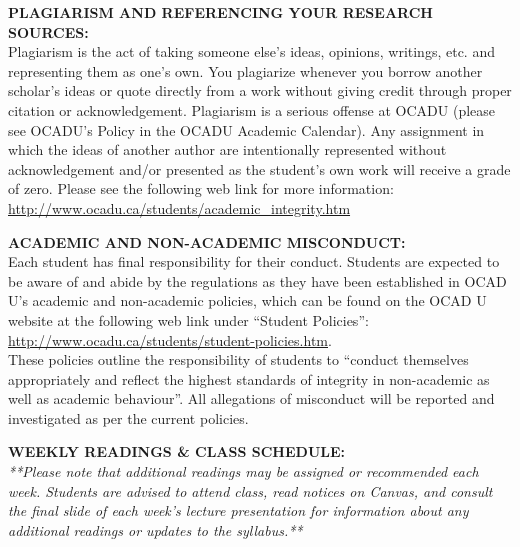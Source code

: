 \documentclass[10pt]{article}
\begin{document}
\textbf{PLAGIARISM AND REFERENCING YOUR RESEARCH SOURCES:}\\
Plagiarism is the act of taking someone else's ideas, opinions, writings, etc. and representing them as one's own. You plagiarize whenever you borrow another scholar's ideas or quote directly from a work without giving credit through proper citation or acknowledgement. Plagiarism is a serious offense at OCADU (please see OCADU's Policy in the OCADU Academic Calendar). Any assignment in which the ideas of another author are intentionally represented without acknowledgement and/or presented as the student's own work will receive a grade of zero. Please see the following web link for more information:\\
\url{http://www.ocadu.ca/students/academic_integrity.htm}

\textbf{ACADEMIC AND NON-ACADEMIC MISCONDUCT:}\\
Each student has final responsibility for their conduct. Students are expected to be aware of and abide by the regulations as they have been established in OCAD U’s academic and non-academic policies, which can be found on the OCAD U website at the following web link under “Student Policies”:\\ \url{http://www.ocadu.ca/students/student-policies.htm}.\\ These policies outline the responsibility of students to “conduct themselves appropriately and reflect the highest standards of integrity in non-academic as well as academic behaviour”. All allegations of misconduct will be reported and investigated as per the current policies.

\textbf{WEEKLY READINGS \& CLASS SCHEDULE:}\\
\textit{**Please note that additional readings may be assigned or recommended each week. Students are advised to attend class, read notices on Canvas, and consult the final slide of each week's lecture presentation for information about any additional readings or updates to the syllabus.**}
\end{document}

